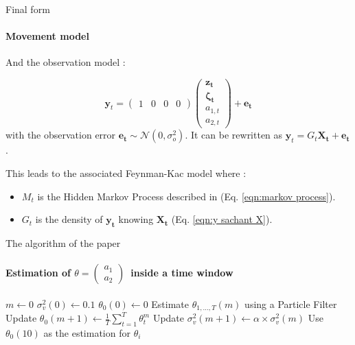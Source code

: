 \documentclass[dvipsnames, handout]{beamer}
\begin{document}
\begin{frame}{Final form}
\framesubtitle{Movement model}

And the observation model :

\begin{equation}
\label{eqn:y sachant X}
    \mathbf{y}_t =
    \begin{pmatrix}
    1 & 0 & 0 & 0
    \end{pmatrix}
    \begin{pmatrix}
        \mathbf{z_t}\\\mathbf{\zeta_t}\\a_{1,t}\\ a_{2,t}
    \end{pmatrix}
    +
    \mathbf{e_t}
\end{equation}
with the observation error $\mathbf{e_t} \sim \mathcal{N}(0,{\sigma_{o}^2})$. It can be rewritten as $\mathbf{y}_t = G_t \mathbf{X_t} + \mathbf{e_t}$.

This leads to the associated Feynman-Kac model where :
\begin{itemize}
    \item $M_t$ is the Hidden Markov Process described in (Eq. \ref{eqn:markov process}).
    \item $G_t$ is the density of $\mathbf{y_t}$ knowing $\mathbf{X_t}$ (Eq. \ref{eqn:y sachant X}).
\end{itemize}

\end{frame}

\begin{frame}{The algorithm of the paper}
\framesubtitle{Estimation of $\theta= \begin{pmatrix}
    a_{1}\\ a_{2}
\end{pmatrix}$\ inside a time window}

\begin{algorithmic}[1]
\State $m \gets 0$ 
\State $\sigma_v^2(0) \gets 0.1$ 
\State $\theta_0(0) \gets 0$ 
\State Estimate $\theta_{1,\dots,T}(m)$ using a Particle Filter
\State Update $\theta_0(m+1) \gets \frac{1}{T}\sum_{t = 1}^{T}\theta_t^m$
\State Update $\sigma_v^2(m+1) \gets \alpha\times\sigma_v^2(m)$
\EndWhile
\State Use $\theta_0(10)$ as the estimation for $\theta_i$
\end{algorithmic}

\end{frame}
\end{document}
